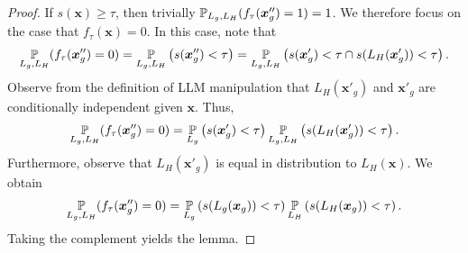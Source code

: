 \lemmaTwo*
    \begin{proof}
        If \(s(\bm{x}) \geq \tau\), then trivially \(\operatorname*{\mathbb{P}}_{L_g, L_H}(f_\tau(\bm{x}''_g) = 1) = 1\). We therefore focus on the case that \(f_\tau(\bm{x}) = 0\). In this case, note that
        \begin{equation*}
            \operatorname*{\mathbb{P}}_{L_g, L_H}(f_\tau(\bm{x}''_g) = 0)
            = 
            \operatorname*{\mathbb{P}}_{L_g, L_H}\left( 
                s(\bm{x}''_g) < \tau
             \right)
            = 
            \operatorname*{\mathbb{P}}_{L_g, L_H}\left( 
                s(\bm{x}'_g) < \tau \cap
                s(L_H(\bm{x}'_g)) < \tau
             \right).
        \end{equation*}
        Observe from the definition of LLM manipulation that \(L_H(\bm{x}'_g)\) and \(\bm{x}'_g\) are conditionally independent given \(\bm{x}\). Thus,
        \begin{equation*}
            \operatorname*{\mathbb{P}}_{L_g, L_H}(f_\tau(\bm{x}''_g) = 0)
        = 
            \operatorname*{\mathbb{P}}_{L_g}\left( 
                s(\bm{x}'_g) < \tau
             \right)
            \operatorname*{\mathbb{P}}_{L_g, L_H}\left( 
                s(L_H(\bm{x}'_g)) < \tau
             \right)
            .
        \end{equation*}
        Furthermore, observe that \(L_H(\bm{x}'_g)\) is equal in distribution to \(L_H(\bm{x})\). We obtain
        \begin{equation*}
            \operatorname*{\mathbb{P}}_{L_g, L_H}(f_\tau(\bm{x}''_g) = 0)
            = 
            \operatorname*{\mathbb{P}}_{L_g}\left( 
                s(L_g(\bm{x}_g)) < \tau
             \right)
            \operatorname*{\mathbb{P}}_{L_H}\left( 
                s(L_H(\bm{x}_g)) < \tau
             \right)
            .
        \end{equation*}
        Taking the complement yields the lemma.
    \end{proof}

\theoremTwo*

